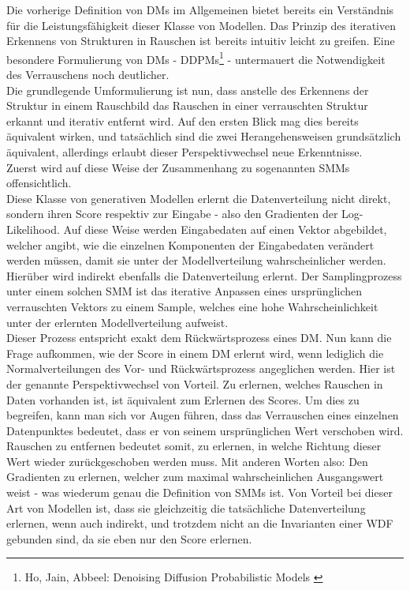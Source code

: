 Die vorherige Definition von \ac{DM}s im Allgemeinen bietet bereits ein Verständnis für die Leistungsfähigkeit dieser Klasse von Modellen. Das Prinzip des iterativen Erkennens von Strukturen in Rauschen ist bereits intuitiv leicht zu greifen. Eine besondere Formulierung von \ac{DM}s - \ac{DDPM}s\footnote{
    Ho, Jain, Abbeel: Denoising Diffusion Probabilistic Models
    \cite{ho2020denoisingdiffusionprobabilisticmodels}
} - untermauert die Notwendigkeit des Verrauschens noch deutlicher. \\
Die grundlegende Umformulierung ist nun, dass anstelle des Erkennens der Struktur in einem Rauschbild das Rauschen in einer verrauschten Struktur erkannt und iterativ entfernt wird. Auf den ersten Blick mag dies bereits äquivalent wirken, und tatsächlich sind die zwei Herangehensweisen grundsätzlich äquivalent, allerdings erlaubt dieser Perspektivwechsel neue Erkenntnisse. \\
Zuerst wird auf diese Weise der Zusammenhang zu sogenannten \ac{SMM}s  offensichtlich. \\
Diese Klasse von generativen Modellen erlernt die Datenverteilung nicht direkt, sondern ihren Score respektiv zur Eingabe - also den Gradienten der Log-Likelihood. Auf diese Weise werden Eingabedaten auf einen Vektor abgebildet, welcher angibt, wie die einzelnen Komponenten der Eingabedaten verändert werden müssen, damit sie unter der Modellverteilung wahrscheinlicher werden. Hierüber wird indirekt ebenfalls die Datenverteilung erlernt. Der Samplingprozess unter einem solchen \ac{SMM} ist das iterative Anpassen eines ursprünglichen verrauschten Vektors zu einem Sample, welches eine hohe Wahrscheinlichkeit unter der erlernten Modellverteilung aufweist. \\
Dieser Prozess entspricht exakt dem Rückwärtsprozess eines \ac{DM}. Nun kann die Frage aufkommen, wie der Score in einem \ac{DM} erlernt wird, wenn lediglich die Normalverteilungen des Vor- und Rückwärtsprozess angeglichen werden. Hier ist der genannte Perspektivwechsel von Vorteil. Zu erlernen, welches Rauschen in Daten vorhanden ist, ist äquivalent zum Erlernen des Scores. Um dies zu begreifen, kann man sich vor Augen führen, dass das Verrauschen eines einzelnen Datenpunktes bedeutet, dass er von seinem ursprünglichen Wert verschoben wird. Rauschen zu entfernen bedeutet somit, zu erlernen, in welche Richtung dieser Wert wieder zurückgeschoben werden muss. Mit anderen Worten also: Den Gradienten zu erlernen, welcher zum maximal wahrscheinlichen Ausgangswert weist - was wiederum genau die Definition von \ac{SMM}s ist. Von Vorteil bei dieser Art von Modellen ist, dass sie gleichzeitig die tatsächliche Datenverteilung erlernen, wenn auch indirekt, und trotzdem nicht an die Invarianten einer \ac{WDF} gebunden sind, da sie eben nur den Score erlernen. \\
